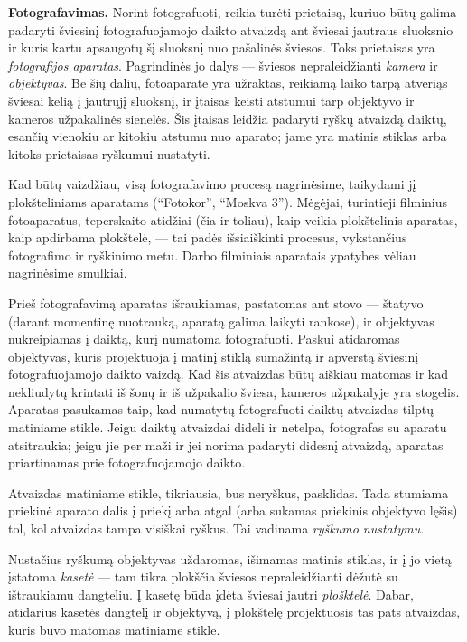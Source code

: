 \documentclass{book}
\begin{document}
			\textbf{Fotografavimas.} Norint fotografuoti, reikia turėti prietaisą, kuriuo būtų galima padaryti šviesinį fotografuojamojo daikto atvaizdą ant šviesai jautraus sluoksnio ir kuris kartu apsaugotų šį sluoksnį nuo pašalinės šviesos. Toks prietaisas yra \textit{fotografijos aparatas}. Pagrindinės jo dalys --- šviesos nepraleidžianti \textit{kamera} ir \textit{objektyvas}. Be šių dalių, fotoaparate yra užraktas, reikiamą laiko tarpą atveriąs šviesai kelią į jautrųjį sluoksnį, ir įtaisas keisti atstumui tarp objektyvo ir kameros užpakalinės sienelės. Šis įtaisas leidžia padaryti ryškų atvaizdą daiktų, esančių vienokiu ar kitokiu atstumu nuo aparato; jame yra matinis stiklas arba kitoks prietaisas ryškumui nustatyti.

			Kad būtų vaizdžiau, visą fotografavimo procesą nagrinėsime, taikydami jį plokšteliniams aparatams (``Fotokor'', ``Moskva 3''). Mėgėjai, turintieji filminius fotoaparatus, teperskaito atidžiai (čia ir toliau), kaip veikia plokštelinis aparatas, kaip apdirbama plokštelė, --- tai padės išsiaiškinti procesus, vykstančius fotografimo ir ryškinimo metu. Darbo filminiais aparatais ypatybes vėliau nagrinėsime smulkiai.

			Prieš fotografavimą aparatas išraukiamas, pastatomas ant stovo --- štatyvo (darant momentinę nuotrauką, aparatą galima laikyti rankose), ir objektyvas nukreipiamas į daiktą, kurį numatoma fotografuoti. Paskui atidaromas objektyvas, kuris projektuoja į matinį stiklą sumažintą ir apverstą šviesinį fotografuojamojo daikto vaizdą. Kad šis atvaizdas būtų aiškiau matomas ir kad nekliudytų krintati iš šonų ir iš užpakalio šviesa, kameros užpakalyje yra stogelis. Aparatas pasukamas taip, kad numatytų fotografuoti daiktų atvaizdas tilptų matiniame stikle. Jeigu daiktų atvaizdai dideli ir netelpa, fotografas su aparatu atsitraukia; jeigu jie per maži ir jei norima padaryti didesnį atvaizdą, aparatas priartinamas prie fotografuojamojo daikto.

			Atvaizdas matiniame stikle, tikriausia, bus neryškus, pasklidas. Tada stumiama priekinė aparato dalis į priekį arba atgal (arba sukamas priekinis objektyvo lęšis) tol, kol atvaizdas tampa visiškai ryškus. Tai vadinama \textit{ryškumo nustatymu}.

			Nustačius ryškumą objektyvas uždaromas, išimamas matinis stiklas, ir į jo vietą įstatoma \textit{kasetė} --- tam tikra plokščia šviesos nepraleidžianti dėžutė su ištraukiamu dangteliu. Į kasetę būda įdėta šviesai jautri \textit{plošktelė}. Dabar, atidarius kasetės dangtelį ir objektyvą, į plokštelę projektuosis tas pats atvaizdas, kuris buvo matomas matiniame stikle.
\end{document}
